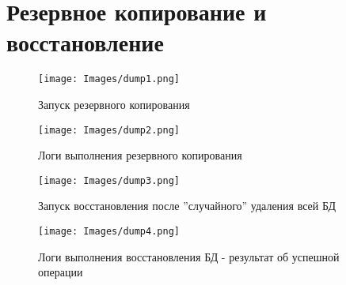 \section{Резервное копирование и восстановление}

\begin{figure}[h]
\centering
\texttt{[image: Images/dump1.png]}
\caption{Запуск резервного копирования}
\end{figure}

\begin{figure}[h]
\centering
\texttt{[image: Images/dump2.png]}
\caption{Логи выполнения резервного копирования}
\end{figure}

\begin{figure}[h]
\centering
\texttt{[image: Images/dump3.png]}
\caption{Запуск восстановления после ''случайного'' удаления всей БД}
\end{figure}

\begin{figure}[h]
\centering
\texttt{[image: Images/dump4.png]}
\caption{Логи выполнения восстановления БД - результат об успешной операции}
\end{figure}
